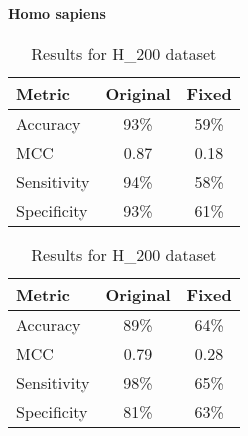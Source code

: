       \paragraph{Homo sapiens}
        \noindent
        \begin{table}[H]
            \centering
            \begin{minipage}{0.45\textwidth}
              \centering
              \begin{tabular}{lcc}
                \toprule
                \textbf{Metric} & \textbf{Original} & \textbf{Fixed} \\
                \midrule
                Accuracy        & 93\%              & 59\%           \\
                MCC             & 0.87              & 0.18           \\
                Sensitivity     & 94\%              & 58\%           \\
                Specificity     & 93\%              & 61\%           \\
                \bottomrule
              \end{tabular}
              \caption{Results for H\_990 dataset}
            \end{minipage}%
            \hfill
            \begin{minipage}{0.45\textwidth}
              \centering
              \begin{tabular}{lcc}
                \toprule
                \textbf{Metric} & \textbf{Original} & \textbf{Fixed} \\
                \midrule
                Accuracy        & 89\%              & 64\%           \\
                MCC             & 0.79              & 0.28           \\
                Sensitivity     & 98\%              & 65\%           \\
                Specificity     & 81\%              & 63\%           \\
                \bottomrule
              \end{tabular}
              \caption{Results for H\_200 dataset}
            \end{minipage}\label{tab:pseust_pstnpss_hs}
        \end{table}

